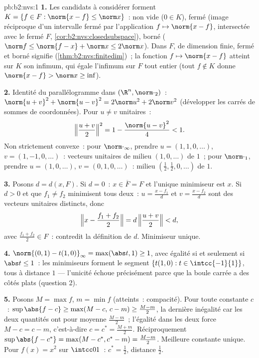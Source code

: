 \begin{solution}{pb:b2:nvs:1}
\textbf{1.} Les candidats à considérer forment $K = \{f \in F
: \norm{x - f} \leq \norm x\}$~: non vide ($0 \in K$), fermé
(image réciproque d'un intervalle fermé par l'application  $f \mapsto
\norm{x - f}$, intersectée avec le fermé $F$,
\cref{cor:b2:nvs:closedsubspace}), borné ($\norm f \leq
\norm{f - x} + \norm x \leq 2\norm x$). Dans $F$, de dimension
finie, fermé et borné signifie 
(\cref{thm:b2:nvs:finitedim})~; la fonction  $f
\mapsto \norm{x - f}$ atteint sur $K$ son infimum, qui égale
l'infimum sur $F$ tout entier (tout $f \notin K$ donne $\norm{x -
f} > \norm x \geq \inf$).

\textbf{2.} Identité du parallélogramme dans $(\R^n,
\norm\cdot_2)$~: $\norm{u + v}^2 + \norm{u - v}^2 = 2\norm u^2 +
2\norm v^2$ (développer les carrés de sommes de coordonnées). Pour
$u \neq v$ unitaires~:
\[
\Bigl\Vert\frac{u+v}2\Bigr\Vert^2 = 1 - \frac{\norm{u -
v}^2}{4} < 1 .
\]
Non strictement convexe~: pour $\norm\cdot_\infty$, prendre $u = (1, 1, 0,
\dots)$, $v = (1, -1, 0, \dots)$~: vecteurs unitaires de milieu
$(1, 0, \dots)$ de  $1$~; pour $\norm\cdot_1$, prendre $u = (1,
0, \dots)$, $v = (0, 1, 0, \dots)$~: milieu $(\frac12,
\frac12, 0, \dots)$ de  $1$.

\textbf{3.} Posons $d = d(x, F)$. Si $d = 0$~: $x \in \overline F =
F$ et l'unique minimiseur est $x$. Si $d > 0$ et que $f_1 \neq f_2$
minimisent tous deux~: $u = \frac{x - f_1}{d}$ et $v = \frac{x -
f_2}{d}$ sont des vecteurs unitaires distincts, donc
\[
\Bigl\Vert x - \frac{f_1 + f_2}2\Bigr\Vert
= d\,\Bigl\Vert\frac{u + v}2\Bigr\Vert < d ,
\]
avec $\frac{f_1 + f_2}2 \in F$~: contredit la définition de
$d$. Minimiseur unique.

\textbf{4.} $\norm{(0,1) - t(1,0)}_\infty = \max(\abs t, 1)
\geq 1$, avec égalité si et seulement si $\abs t \leq 1$~: les minimiseurs forment
le segment $\{t(1, 0) : t \in \intcc{-1}{1}\}$, tous à distance
$1$ --- l'unicité échoue précisément parce que la boule carrée a des
côtés plats (question 2).

\textbf{5.} Posons $M = \max f$, $m = \min f$ (atteints~:
compacité). Pour toute constante $c$~: $\sup\abs{f - c} \geq
\max(M - c,\, c - m) \geq \frac{M - m}2$, la dernière inégalité
car les deux quantités ont pour moyenne $\frac{M-m}2$~; l'égalité dans les
deux force $M - c = c - m$, c'est-à-dire $c = c^* = \frac{M + m}2$.
Réciproquement $\sup\abs{f - c^*} = \max(M - c^*, c^* - m) =
\frac{M - m}2$. Meilleure constante unique. Pour $f(x) = x^2$ sur
$\intcc01$~: $c^* = \frac12$, distance $\frac12$.


\end{solution}
